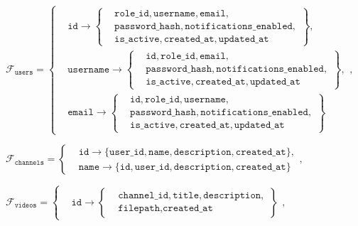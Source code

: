 $
\mathcal{F}_{\texttt{users}} =
\left\{
    \begin{aligned}
        & \texttt{id} \to
        \left\{
            \begin{aligned}
                & \texttt{role\_id}, \texttt{username}, \texttt{email},\\
                & \texttt{password\_hash}, \texttt{notifications\_enabled},\\
                & \texttt{is\_active}, \texttt{created\_at}, \texttt{updated\_at}
            \end{aligned}
        \right\},\\[6pt]
        & \texttt{username} \to
        \left\{
            \begin{aligned}
                & \texttt{id}, \texttt{role\_id}, \texttt{email},\\
                & \texttt{password\_hash}, \texttt{notifications\_enabled},\\
                & \texttt{is\_active}, \texttt{created\_at}, \texttt{updated\_at}
            \end{aligned}
        \right\},\\[6pt]
        & \texttt{email} \to
        \left\{
            \begin{aligned}
                & \texttt{id}, \texttt{role\_id}, \texttt{username},\\
                & \texttt{password\_hash}, \texttt{notifications\_enabled},\\
                & \texttt{is\_active}, \texttt{created\_at}, \texttt{updated\_at}
            \end{aligned}
        \right\}
    \end{aligned}
\right.,
$

$
\mathcal{F}_{\texttt{channels}} =
\left\{
    \begin{aligned}
        & \texttt{id} \to \{\texttt{user\_id}, \texttt{name}, \texttt{description}, \texttt{created\_at}\},\\
        & \texttt{name} \to \{\texttt{id}, \texttt{user\_id}, \texttt{description}, \texttt{created\_at}\}
    \end{aligned}
\right.,
$

$
\mathcal{F}_{\texttt{videos}} =
\left\{
    \begin{aligned}
        & \texttt{id} \to \left\{
                              \begin{aligned}
                                  & \texttt{channel\_id}, \texttt{title}, \texttt{description}, \\
                                  & \texttt{filepath}, \texttt{created\_at}
                              \end{aligned}
        \right\}
    \end{aligned}
\right.,
$

